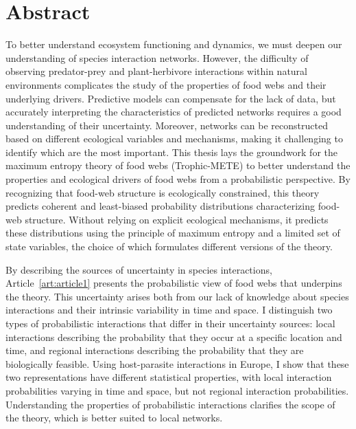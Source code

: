 \documentclass[12pt,twoside,phd]{dms}
\numberwithin{equation}{section}
\numberwithin{table}{chapter}
\numberwithin{figure}{chapter}
\begin{document}

\anglais
\chapter*{Abstract}

To better understand ecosystem functioning and dynamics, we must deepen our
understanding of species interaction networks. However, the difficulty of
observing predator-prey and plant-herbivore interactions within natural
environments complicates the study of the properties of food webs and their
underlying drivers. Predictive models can compensate for the lack of data, but
accurately interpreting the characteristics of predicted networks requires a
good understanding of their uncertainty. Moreover, networks can be reconstructed
based on different ecological variables and mechanisms, making it challenging to
identify which are the most important. This thesis lays the groundwork for the
maximum entropy theory of food webs (Trophic-METE) to better understand the
properties and ecological drivers of food webs from a probabilistic perspective.
By recognizing that food-web structure is ecologically constrained, this theory
predicts coherent and least-biased probability distributions characterizing
food-web structure. Without relying on explicit ecological mechanisms, it
predicts these distributions using the principle of maximum entropy and a
limited set of state variables, the choice of which formulates different
versions of the theory.

By describing the sources of uncertainty in species interactions,
Article~\ref{art:article1} presents the probabilistic view of food webs that
underpins the theory. This uncertainty arises both from our lack of knowledge
about species interactions and their intrinsic variability in time and space. I
distinguish two types of probabilistic interactions that differ in their
uncertainty sources: local interactions describing the probability that they
occur at a specific location and time, and regional interactions describing the
probability that they are biologically feasible. Using host-parasite
interactions in Europe, I show that these two representations have different
statistical properties, with local interaction probabilities varying in time and
space, but not regional interaction probabilities. Understanding the properties
of probabilistic interactions clarifies the scope of the theory, which is better
suited to local networks.
\end{document}
